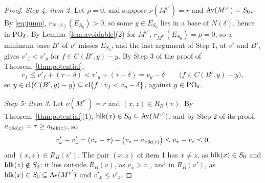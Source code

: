 \begin{proof}
\emph{Step 4: item 2.}  Let $\rho=0$, and suppose $\nu(M^{v'})=r$ and
$\operatorname{Av}(M^{v'})=S_0$.  By \eqref{eq:jump}, $r_{N(\delta)}(E_{S_0})>0$, so some
$y\in E_{S_0}$ lies in a base of $N(\delta)$, hence in $\mathrm{PO}_\delta$.  By
Lemma~\ref{lem:avoidable}(2) for $M^{v'}$, $r_{M^{v'}}(E_{S_0})=\rho=0$, so a
minimum base $B'$ of $v'$ misses $E_{S_0}$, and the last argument of Step 1, at
$v'$ and $B'$, gives $v'_f<v'_y$ for $f\in C(B',y)-y$.  By Step 3 of the proof of
Theorem~\ref{thm:potential},
\[
  v_f\le v'_f+(\tau-\delta)<v'_y+(\tau-\delta)=v_y-\delta\qquad\bigl(f\in C(B',y)-y\bigr),
\]
so $y\in\operatorname{cl}\bigl(C(B',y)-y\bigr)\subseteq\operatorname{cl}\{f:v_f<v_y-\delta\}$, against
$y\in\mathrm{PO}_\delta$.

\emph{Step 5: item 3.}  Let $\nu(M^{v'})=r$ and $(x,z)\in R_B(v)$.  By
Theorem~\ref{thm:potential}(1), $\operatorname{blk}(x)\in S_0\subseteq\operatorname{Av}(M^{v'})$, and by Step 2
of its proof, $a_{\operatorname{blk}(x)}=\tau\ge a_{\operatorname{blk}(z)}$, so
\[
  v'_x-v'_z=(v_x-\tau)-\bigl(v_z-a_{\operatorname{blk}(z)}\bigr)\le v_x-v_z\le0,
\]
and $(x,z)\in R_B(v')$.  The pair $(x,z)$ of item 1 has $x\ne z$, as $\operatorname{blk}(x)\in S_0$
and $\operatorname{blk}(z)\notin S_0$; it lies outside $R_B(v)$, as $v_x>v_z$, and in $R_B(v')$,
as $\operatorname{blk}(x)\in S_0\subseteq\operatorname{Av}(M^{v'})$ and $v'_x\le v'_z$.
\end{proof}

